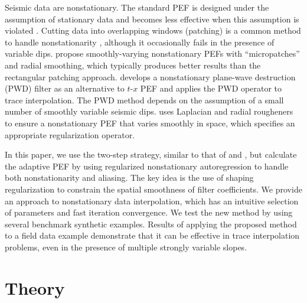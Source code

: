 Seismic data are nonstationary. The standard PEF is designed under the
assumption of stationary data and becomes less effective when this
assumption is violated \cite[]{Claerbout92}.  Cutting data into
overlapping windows (patching) is a common method to handle
nonstationarity \cite[]{Claerbout10}, although it occasionally fails
in the presence of variable 
dips. \cite{Crawley99} propose smoothly-varying
nonstationary PEFs with ``micropatches'' and radial smoothing, which
typically produces better results than the rectangular patching
approach. \cite{GEO67-06-19461960} develops a nonstationary plane-wave
destruction (PWD) filter as an alternative to $t$-$x$ PEF
\cite[]{Claerbout92} and applies the PWD operator to trace
interpolation. The PWD method depends on the assumption of a small
number of smoothly variable seismic dips. \cite{Curry03} uses
Laplacian and radial rougheners to ensure a nonstationary PEF that
varies smoothly in space, which specifies an appropriate
regularization operator.

In this paper, we use the two-step strategy, similar to that of
\cite{Claerbout92} and \cite{Crawley99}, but calculate the
adaptive PEF by using regularized nonstationary autoregression
\cite[]{Fomel09} to handle both nonstationarity and
aliasing. The key idea is the use of shaping regularization
\cite[]{Fomel07} to constrain the spatial smoothness of filter
coefficients. We provide an approach to nonstationary data
interpolation, which has an intuitive selection of
parameters and fast iteration
convergence. We test the new method by using several benchmark
synthetic examples. Results of applying the proposed method to a field
data example demonstrate that it can
be effective in trace interpolation problems, even in the presence of
multiple strongly variable slopes.

\section{Theory}

